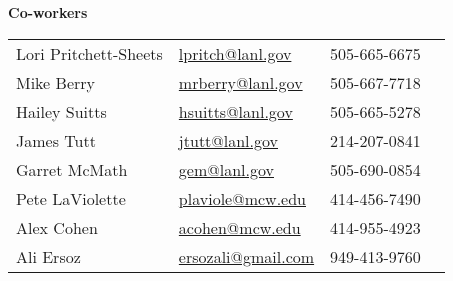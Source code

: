 \begin{minipage}{0.50\textwidth} 
\begin{center}
{\normalsize \textbf{Co-workers}} \vspace{1mm} %
\end{center}
\begin{tabular}{llll}
	Lori Pritchett-Sheets & \href{mailto:lpritch@lanl.gov}{lpritch@lanl.gov} & 505-665-6675 \\
	Mike Berry       & \href{mailto:mrberry@lanl.gov}{mrberry@lanl.gov} & 505-667-7718 \\
	Hailey Suitts    & \href{mailto:hsuitts@lanl.gov}{hsuitts@lanl.gov} & 505-665-5278 \\
	James Tutt       & \href{mailto:jtutt@lanl.gov}{jtutt@lanl.gov} & 214-207-0841 \\
	Garret McMath    & \href{mailto:gem@lanl.gov}{gem@lanl.gov}    & 505-690-0854 \\
	Pete LaViolette  &  \href{mailto:plaviole@mcw.edu}{plaviole@mcw.edu} & 414-456-7490 \\ %
	Alex Cohen       &  \href{mailto:acohen@mcw.edu}{acohen@mcw.edu} & 414-955-4923 \\
	Ali Ersoz        &  \href{mailto:ersozali@gmail.com}{ersozali@gmail.com} & 949-413-9760 \\
\end{tabular}
\end{minipage}





